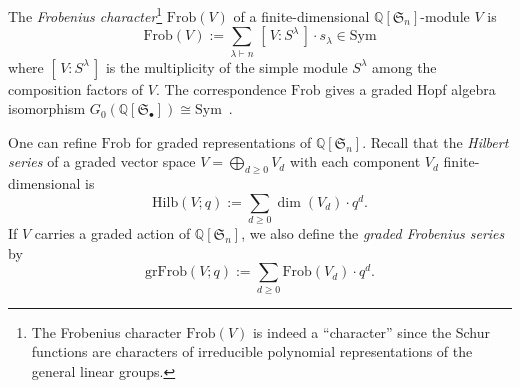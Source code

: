 \documentclass[ALCO,ThmDefs,published]{cedram}
\newcommand{\symm}{{\mathfrak{S}}}
\newcommand{\QQ}{{\mathbb {Q}}}
\theoremstyle{plain}
\newcommand{\Hilb}{{\mathrm {Hilb}}}
\newcommand{\grFrob}{{\mathrm {grFrob}}}
\newcommand{\Sym}{{\mathrm {Sym}}}
\newcommand{\Frob}{{\mathrm {Frob}}}
\newcommand{\symm}{{\mathfrak{S}}}
\newcommand{\QQ}{{\mathbb {Q}}}
\begin{document}
The \emph{Frobenius character}\footnote{The Frobenius character $\Frob(V)$ is indeed a ``character'' since the Schur functions are characters of irreducible polynomial representations of the general linear groups.} $\Frob(V)$ of a finite-dimensional $\QQ[\symm_n]$-module $V$ is
\begin{equation}
\Frob(V) := \sum_{\lambda \vdash n} \, [\, V : S^\lambda\, ] \cdot s_{\lambda} \in \Sym
\end{equation}
where $[\, V: S^\lambda \,]$ is the multiplicity of the simple module $S^\lambda$ among the composition factors of $V$.
The correspondence $\Frob$ gives a graded Hopf algebra isomorphism $G_0(\QQ[\symm_\bullet]) \cong \Sym$~\cite[\S4.4]{GrinbergReiner}.

One can refine $\Frob$ for graded representations of $\QQ[\symm_n]$.
Recall that the \emph{Hilbert series} of a graded vector space $V = \bigoplus_{d \geq 0} V_d$ with each component $V_d$ finite-dimensional is
\begin{equation}
\Hilb(V;q) := \sum_{d \geq 0} \dim(V_d) \cdot q^d.
\end{equation}
If $V$ carries a graded action of $\QQ[\symm_n]$, we also define the \emph{graded Frobenius series} by
\begin{equation}
\grFrob(V;q) := \sum_{d \geq 0} \Frob(V_d) \cdot q^d.
\end{equation}
\end{document}
